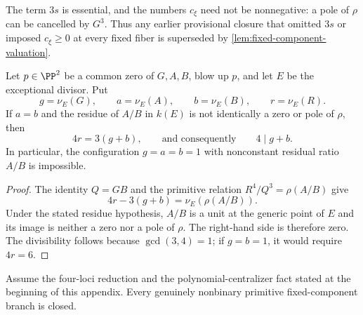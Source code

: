 The term \(3s\) is essential, and the numbers \(c_\xi\) need not be
nonnegative: a pole of \(\rho\) can be cancelled by \(G^3\).  Thus any
earlier provisional closure that omitted \(3s\) or imposed
\(c_\xi\ge0\) at every fixed fiber is superseded by
\cref{lem:fixed-component-valuation}.

\begin{corollary}
\label{cor:quartic-fixed-component-basepoint-valuation}
Let \(p\in\PP^2\) be a common zero of \(G,A,B\), blow up \(p\), and let
\(E\) be the exceptional divisor.  Put
\[
 g=\nu_E(G),\qquad a=\nu_E(A),\qquad b=\nu_E(B),\qquad
 r=\nu_E(R).
\]
If \(a=b\) and the residue of \(A/B\) in \(k(E)\) is not identically a
zero or pole of \(\rho\), then
\[
 4r=3(g+b),\qquad\text{and consequently}\qquad 4\mid g+b.
\]
In particular, the configuration \(g=a=b=1\) with nonconstant residual
ratio \(A/B\) is impossible.
\end{corollary}

\begin{proof}
The identity \(Q=GB\) and the primitive relation
\(R^4/Q^3=\rho(A/B)\) give
\[
 4r-3(g+b)=\nu_E\!\left(\rho(A/B)\right).
\]
Under the stated residue hypothesis, \(A/B\) is a unit at the generic point
of \(E\) and its image is neither a zero nor a pole of \(\rho\).  The
right-hand side is therefore zero.  The divisibility follows because
\(\gcd(3,4)=1\); if \(g=b=1\), it would require \(4r=6\).
\end{proof}

\begin{theorem}
\label{thm:quartic-nonbinary-fixed-components}
Assume the four-loci reduction and the polynomial-centralizer fact stated
at the beginning of this appendix.  Every genuinely nonbinary primitive
fixed-component branch is closed.
\end{theorem}

